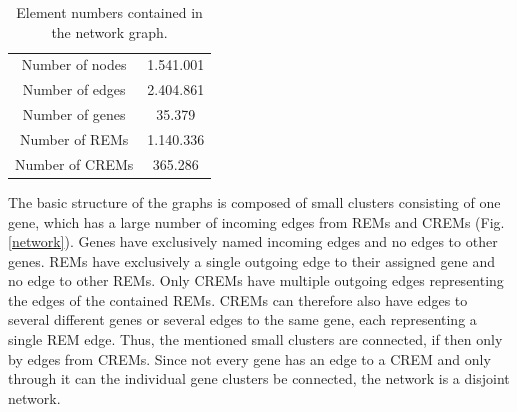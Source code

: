 \documentclass[pdftex,12pt,a4paper]{report}
\begin{document}
\renewcommand{\arraystretch}{2}
\begin{table}[!ht]
\centering
\begin{tabular}{|c|c|}
\hline
Number of nodes		& 1.541.001		\\
Number of edges		& 2.404.861		\\
Number of genes		& 35.379        \\
Number of REMs		& 1.140.336		\\
Number of CREMs		& 365.286      	\\
\hline
\end{tabular}
\caption{Element numbers contained in the network graph.}
\label{numbers}
\end{table}
\renewcommand{\arraystretch}{1}
The basic structure of the graphs is composed of small clusters consisting of one gene, which has a large number of incoming edges from REMs and CREMs (Fig. \ref{network}). Genes have exclusively named incoming edges and no edges to other genes. REMs have exclusively a single outgoing edge to their assigned gene and no edge to other REMs. Only CREMs have multiple outgoing edges representing the edges of the contained REMs. CREMs can therefore also have edges to several different genes or several edges to the same gene, each representing a single REM edge. Thus, the mentioned small clusters are connected, if then only by edges from CREMs. Since not every gene has an edge to a CREM and only through it can the individual gene clusters be connected, the network is a disjoint network.
 
\end{document}
